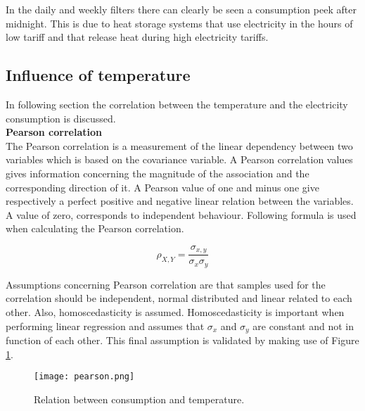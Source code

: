 

In the daily and weekly filters there can clearly be seen a consumption peek after midnight. This is due to heat storage systems that use electricity in the hours of low tariff and that release heat during high electricity tariffs. 


\subsection{Influence of temperature}
In following section the correlation between the temperature and the electricity consumption is discussed.\\


\textbf{Pearson correlation}\\
The Pearson correlation is a measurement of the linear dependency between two variables which is based on the covariance variable. A Pearson correlation values gives information concerning the magnitude of the association and the corresponding direction of it. A Pearson value of one and minus one give respectively a perfect positive and negative linear relation between the variables. A value of zero, corresponds to independent behaviour. Following formula is used when calculating the Pearson correlation. 

\begin{equation}\label{eq:pearson}
	\rho_{X,Y} = \frac{\sigma_{x,y}}{\sigma_x\sigma_y}
\end{equation}

Assumptions concerning Pearson correlation are that samples used for the correlation should be independent, normal distributed and linear related to each other. Also, homoscedasticity is assumed. Homoscedasticity is important when performing linear regression and assumes that $ \sigma_x $ and $ \sigma_y $ are constant and not in function of each other. This final assumption is validated by making use of Figure \ref{fig:pearson}.

\begin{figure}[h!]
	\centering
	\texttt{[image: pearson.png]}
	\caption{Relation between consumption and temperature.}
	\label{fig:pearson}
\end{figure}

